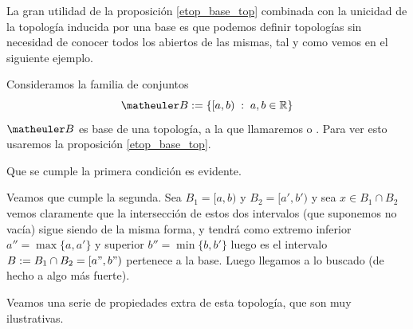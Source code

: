 La gran utilidad de la proposición \ref{etop_base_top} combinada con la unicidad de la topología inducida por una base es que podemos definir topologías sin necesidad de conocer todos los abiertos de las mismas, tal y como vemos en el siguiente ejemplo.
\begin{exa}
	\label{etop_ej_sorgenfrey}
	
	Consideramos la familia de conjuntos \begin{equation}\B:=\{[a,b)\midc a,b\in\R\}\end{equation}
	$\B$ es base de una topología, a la que llamaremos \tbitop[$\T_{[,)}$]{de Sorgenfrey} o . Para ver esto usaremos la proposición \ref{etop_base_top}.
		
	Que se cumple la primera condición es evidente.
		
	Veamos que cumple la segunda. Sea $B_1=[a,b)$ y $B_2=[a',b')$ y sea $x \in B_1 \cap B_2$ vemos claramente que la intersección de estos dos intervalos (que suponemos no vacía) sigue siendo de la misma forma, y tendrá como extremo inferior $a'' = \max\{a,a'\} $ y superior $b''=\min\{b,b'\}$ luego es el intervalo $B:=B_1 \cap B_2 = [a",b")$ pertenece a la base. Luego llegamos a lo buscado (de hecho a algo más fuerte).
	\end{exa}
	Veamos una serie de propiedades extra de esta topología, que son muy ilustrativas.
